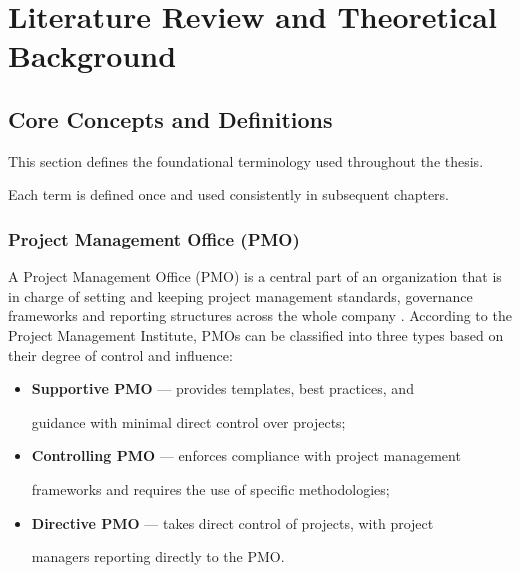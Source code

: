\chapter{Literature Review and Theoretical Background} 

\label{chap:litreview} 

  

\section{Core Concepts and Definitions} 

\label{sec:concepts} 

 

This section defines the foundational terminology used throughout the thesis.  

Each term is defined once and used consistently in subsequent chapters. 

  

\subsection{Project Management Office (PMO)} 

A Project Management Office (PMO) is a central part of an organization that is in charge of setting and keeping project management standards, governance frameworks and reporting structures across the whole company  \cite{pmi2021}. According to the Project Management Institute, PMOs can be classified into three types based on their degree of control and influence: 

  

\begin{itemize} 

    \item \textbf{Supportive PMO} --- provides templates, best practices, and  

    guidance with minimal direct control over projects; 

    \item \textbf{Controlling PMO} --- enforces compliance with project management  

    frameworks and requires the use of specific methodologies; 

    \item \textbf{Directive PMO} --- takes direct control of projects, with project  

    managers reporting directly to the PMO. 

\end{itemize} 

